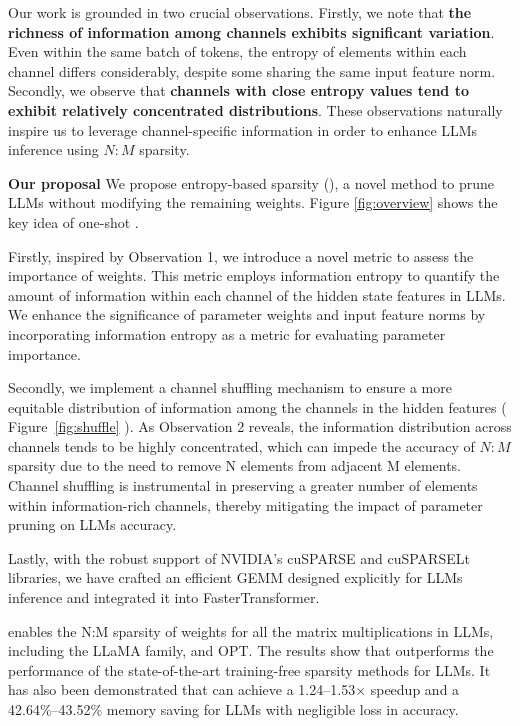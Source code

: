 Our work is grounded in two crucial observations. Firstly, we note that \textbf{the richness of information among channels exhibits significant variation}. Even within the same batch of tokens, the entropy of elements within each channel differs considerably, despite some sharing the same input feature norm. Secondly, we observe that \textbf{channels with close entropy values tend to exhibit relatively concentrated distributions}. These observations naturally inspire us to leverage channel-specific information in order to enhance LLMs inference using $N \colon M$ sparsity.

\textbf{Our proposal} 
We propose entropy-based sparsity (\name ), a novel method to prune LLMs without modifying the remaining weights. Figure \ref{fig:overview} shows the key idea of one-shot \name. 

Firstly, inspired by Observation 1, we introduce a novel metric to assess the importance of weights. This metric employs information entropy to quantify the amount of information within each channel of the hidden state features in LLMs. We enhance the significance of parameter weights and input feature norms by incorporating information entropy as a metric for evaluating parameter importance.

Secondly, we implement a channel shuffling mechanism to ensure a more equitable distribution of information among the channels in the hidden features ( Figure~\ref{fig:shuffle} ). As Observation 2 reveals, the information distribution across channels tends to be highly concentrated, which can impede the accuracy of $N \colon M$ sparsity due to the need to remove N elements from adjacent M elements. Channel shuffling is instrumental in preserving a greater number of elements within information-rich channels, thereby mitigating the impact of parameter pruning on LLMs accuracy.

Lastly, with the robust support of NVIDIA's cuSPARSE\cite{cuSPARSE} and cuSPARSELt\cite{cuSPARSELt} libraries, we have crafted an efficient \name GEMM designed explicitly for LLMs inference and integrated it into FasterTransformer.

\name enables the N:M sparsity of weights for all the matrix multiplications in LLMs, including the LLaMA family, and OPT. The results show that \name outperforms the performance of the state-of-the-art training-free sparsity methods \cite{frantar2023massive,sun2023simple} for LLMs. 
It has also been demonstrated that \name can achieve a 1.24--1.53$\times$ speedup and a 42.64\%--43.52\% memory saving for LLMs with negligible loss in accuracy. 

